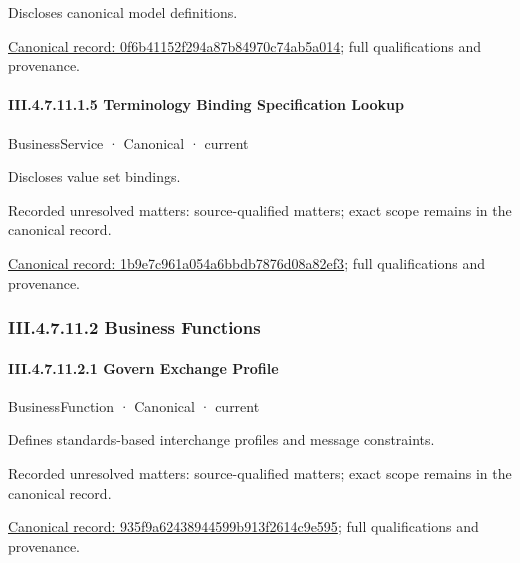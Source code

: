 Discloses canonical model definitions.


{\footnotesize \href{../../../../continuum/business/business-service/0f6b41152f294a87b84970c74ab5a014.md}{Canonical record: 0f6b41152f294a87b84970c74ab5a014}; full qualifications and provenance.}\par
\paragraph*{III.4.7.11.1.5 Terminology Binding Specification Lookup}
\label{navigation:III.4.7.11.1.5}

\label{element:1b9e7c961a054a6bbdb7876d08a82ef3}
{\small BusinessService · Canonical · current}\par

Discloses value set bindings.


{\small Recorded unresolved matters: source-qualified matters; exact scope remains in the canonical record.}\par
{\footnotesize \href{../../../../continuum/business/business-service/1b9e7c961a054a6bbdb7876d08a82ef3.md}{Canonical record: 1b9e7c961a054a6bbdb7876d08a82ef3}; full qualifications and provenance.}\par
\subsubsection*{III.4.7.11.2 Business Functions}
\label{navigation:III.4.7.11.2}

\paragraph*{III.4.7.11.2.1 Govern Exchange Profile}
\label{navigation:III.4.7.11.2.1}

\label{element:935f9a62438944599b913f2614c9e595}
{\small BusinessFunction · Canonical · current}\par

Defines standards-based interchange profiles and message constraints.


{\small Recorded unresolved matters: source-qualified matters; exact scope remains in the canonical record.}\par
{\footnotesize \href{../../../../continuum/business/business-function/935f9a62438944599b913f2614c9e595.md}{Canonical record: 935f9a62438944599b913f2614c9e595}; full qualifications and provenance.}\par
